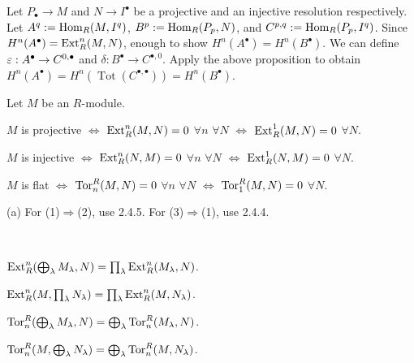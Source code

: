 \documentclass{../../small}
\DeclareMathOperator{\Tot}{Tot}
\begin{document}
\begin{pf}
Let $P_\bullet\to M$ and $N\to I^\bullet$ be a projective and an injective resolution respectively.
Let $A^q:=\operatorname{Hom}_R(M,I^q)$, $B^p:=\operatorname{Hom}_R(P_p,N)$, and $C^{p,q}:=\operatorname{Hom}_R(P_p,I^q)$.
Since $H^n(A^\bullet)=\operatorname{Ext}_R^n(M,N)$, enough to show $H^n(A^\bullet)=H^n(B^\bullet)$.
We can define $\varepsilon:A^\bullet\to C^{0,\bullet}$ and $\delta:B^\bullet\to C^{\bullet,0}$.
Apply the above proposition to obtain $H^n(A^\bullet)=H^n(\Tot(C^{\bullet,\bullet}))=H^n(B^\bullet)$.
\end{pf}

\begin{prop*}[2.4.6]
Let $M$ be an $R$-module.
\begin{parts}
\item $M$ is projective $\Leftrightarrow$ $\operatorname{Ext}_R^n(M,N)=0$ $\forall n$ $\forall N$ $\Leftrightarrow$ $\operatorname{Ext}_R^1(M,N)=0$ $\forall N$.
\item $M$ is injective $\Leftrightarrow$ $\operatorname{Ext}_R^n(N,M)=0$ $\forall n$ $\forall N$ $\Leftrightarrow$ $\operatorname{Ext}_R^1(N,M)=0$ $\forall N$.
\item $M$ is flat $\Leftrightarrow$ $\operatorname{Tor}^R_n(M,N)=0$ $\forall n$ $\forall N$ $\Leftrightarrow$ $\operatorname{Tor}^R_1(M,N)=0$ $\forall N$.
\end{parts}
\end{prop*}
\begin{pf}
(a) For (1)$\Rightarrow$(2), use 2.4.5. For (3)$\Rightarrow$(1), use 2.4.4.
\end{pf}


\begin{lem*}\,
\begin{parts}
\item $\operatorname{Ext}_R^n(\bigoplus_\lambda M_\lambda,N)=\prod_\lambda\operatorname{Ext}_R^n(M_\lambda,N)$.
\item $\operatorname{Ext}_R^n(M,\prod_\lambda N_\lambda)=\prod_\lambda\operatorname{Ext}_R^n(M,N_\lambda)$.
\item $\operatorname{Tor}^R_n(\bigoplus_\lambda M_\lambda,N)=\bigoplus_\lambda\operatorname{Tor}^R_n(M_\lambda,N)$.
\item $\operatorname{Tor}^R_n(M,\bigoplus_\lambda N_\lambda)=\bigoplus_\lambda\operatorname{Tor}^R_n(M,N_\lambda)$.
\end{parts}
\end{lem*}
\end{document}

